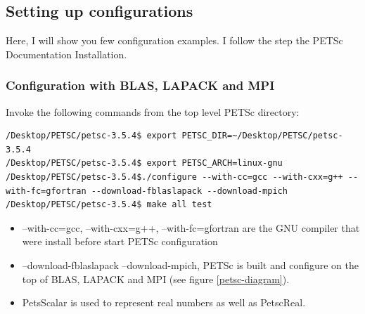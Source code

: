 \documentclass{article}
\begin{document}
\subsection{Setting up configurations}
Here, I will show you few configuration examples. I follow the step the PETSc Documentation Installation.

\subsubsection{Configuration with BLAS, LAPACK and MPI} 
Invoke the following commands from the top level PETSc directory:
\footnotesize
\begin{verbatim}
/Desktop/PETSC/petsc-3.5.4$ export PETSC_DIR=~/Desktop/PETSC/petsc-3.5.4
/Desktop/PETSC/petsc-3.5.4$ export PETSC_ARCH=linux-gnu
/Desktop/PETSC/petsc-3.5.4$./configure --with-cc=gcc --with-cxx=g++ --with-fc=gfortran --download-fblaslapack --download-mpich 
/Desktop/PETSC/petsc-3.5.4$ make all test 
\end{verbatim}
\normalsize
\begin{itemize}
 \item --with-cc=gcc, --with-cxx=g++, --with-fc=gfortran are the GNU compiler that were install before start PETSc configuration
 \item --download-fblaslapack --download-mpich, PETSc is built and configure on the top of BLAS, LAPACK and MPI (see figure \ref{petsc-diagram}). 
 \item PetsScalar is used to represent real numbers as well as PetscReal.
\end{itemize}
\end{document}
